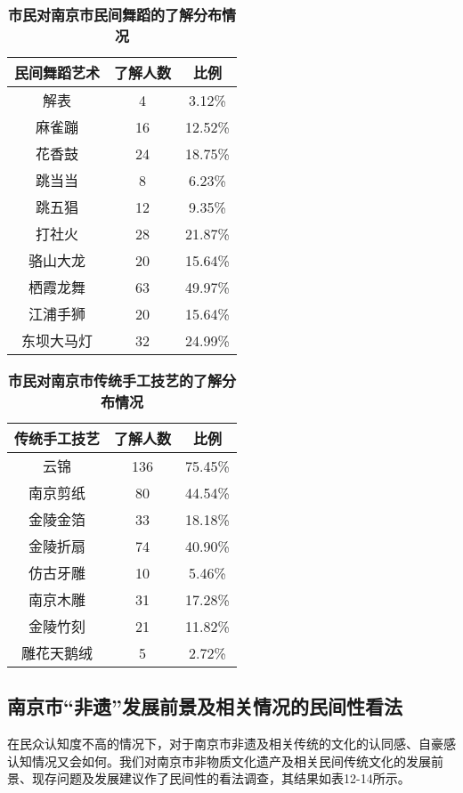 \documentclass[12pt]{article}%
\begin{document}
\begin{table}[htbp]
  \centering
  \caption{\bf{市民对南京市民间舞蹈的了解分布情况}}
    \begin{tabular}{ccc}
    \hline
    民间舞蹈艺术 & 了解人数  & 比例 \\
    \hline
    解表    & 4     & 3.12\% \\
    麻雀蹦   & 16    & 12.52\% \\
    花香鼓   & 24    & 18.75\% \\
    跳当当   & 8     & 6.23\% \\
    跳五猖   & 12    & 9.35\% \\
    打社火   & 28    & 21.87\% \\
    骆山大龙  & 20    & 15.64\% \\
    栖霞龙舞  & 63    & 49.97\% \\
    江浦手狮  & 20    & 15.64\% \\
    东坝大马灯 & 32    & 24.99\% \\
    \hline
    \end{tabular}%
\end{table}%

\begin{table}[htbp]
  \centering
  \caption{\bf{市民对南京市传统手工技艺的了解分布情况}}
    \begin{tabular}{ccc}
    \hline
    传统手工技艺 & 了解人数  & 比例 \\
    \hline
    云锦    & 136   & 75.45\% \\
    南京剪纸  & 80    & 44.54\% \\
    金陵金箔  & 33    & 18.18\% \\
    金陵折扇  & 74    & 40.90\% \\
    仿古牙雕  & 10    & 5.46\% \\
    南京木雕  & 31    & 17.28\% \\
    金陵竹刻  & 21    & 11.82\% \\
    雕花天鹅绒 & 5     & 2.72\% \\
    \hline
    \end{tabular}%
\end{table}%



\subsection{南京市“非遗”发展前景及相关情况的民间性看法}

在民众认知度不高的情况下，对于南京市非遗及相关传统的文化的认同感、自豪感认知情况又会如何。我们对南京市非物质文化遗产及相关民间传统文化的发展前景、现存问题及发展建议作了民间性的看法调查，其结果如表12-14所示。
\end{document}
